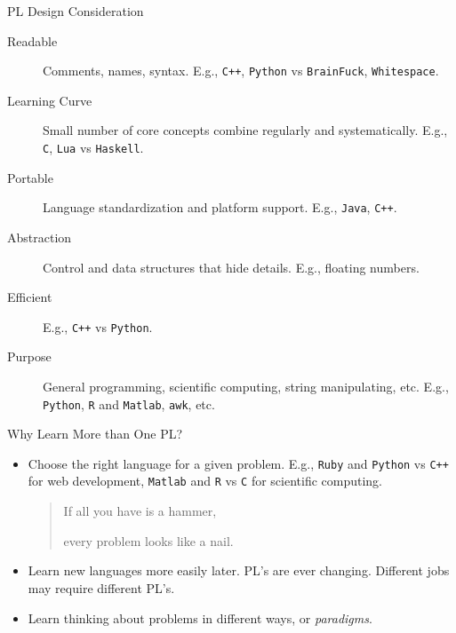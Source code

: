 \documentclass[presentation]{beamer}
\begin{document}
\begin{frame}[fragile,label={sec:orgheadline8}]{PL Design Consideration}
 \begin{description}
\item[{Readable}] Comments, names, syntax.  E.g., \texttt{C++}, \texttt{Python} vs
\texttt{BrainFuck}, \texttt{Whitespace}.
\item[{Learning Curve}] Small number of core concepts combine regularly
and systematically.  E.g., \texttt{C}, \texttt{Lua} vs \texttt{Haskell}.
\item[{Portable}] Language standardization and platform support.  E.g.,
\texttt{Java}, \texttt{C++}.
\item[{Abstraction}] Control and data structures that hide details.
E.g., floating numbers.
\item[{Efficient}] E.g., \texttt{C++} vs \texttt{Python}.
\item[{Purpose}] General programming, scientific computing, string
manipulating, etc.  E.g., \texttt{Python}, \texttt{R} and \texttt{Matlab}, \texttt{awk},
etc.
\end{description}
\end{frame}

\begin{frame}[fragile,label={sec:orgheadline9}]{Why Learn More than One PL?}
 \begin{itemize}
\item Choose the right language for a given problem.  E.g., \texttt{Ruby} and
\texttt{Python} vs \texttt{C++} for web development, \texttt{Matlab} and \texttt{R} vs \texttt{C}
for scientific computing.

\begin{quote}
If all you have is a hammer,

every problem looks like a nail.
\end{quote}

\item Learn new languages more easily later.  PL's are ever changing.
Different jobs may require different PL's.
\item Learn thinking about problems in different ways, or \emph{paradigms}.
\end{itemize}
\end{frame}
\end{document}
